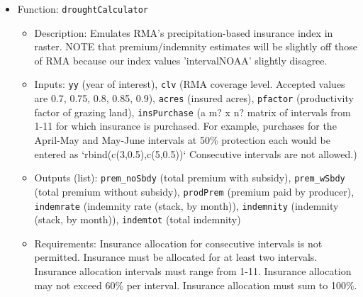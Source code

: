 \documentclass[11pt]{article}
\begin{document}
\begin{itemize}
\item Function: \verb!droughtCalculator!
	\begin{itemize}
	\item Description: Emulates RMA's precipitation-based insurance index in raster. NOTE
  that premium/indemnity estimates will be slightly off those of RMA because our index values 'intervalNOAA' slightly disagree.
	\item Inputs: \verb!yy! (year of interest), \verb!clv! (RMA coverage level. Accepted values are 0.7, 0.75, 0.8, 0.85, 0.9), \verb!acres! (insured acres), \verb!pfactor! (productivity factor of grazing land), \verb!insPurchase! (a m? x n? matrix of intervals from 1-11 for which insurance is purchased. For example, purchases for the April-May and May-June intervals at 50\% protection each would be entered as `rbind(c(3,0.5),c(5,0.5))` Consecutive intervals are not allowed.)
	\item Outputs (list): \verb!prem_noSbdy! (total premium with subsidy), \verb!prem_wSbdy! (total premium without subsidy), \verb!prodPrem! (premium paid by producer), \verb!indemrate! (indemnity rate (stack, by month)), \verb!indemnity! (indemnity (stack, by month)), \verb!indemtot! (total indemnity)  
	\item Requirements: Insurance allocation for consecutive intervals is not permitted. Insurance must be allocated for at least two intervals. Insurance allocation intervals must range from 1-11. Insurance allocation may not exceed 60\% per interval. Insurance allocation must sum to 100\%.
	\end{itemize}
\end{itemize}
\end{document}
